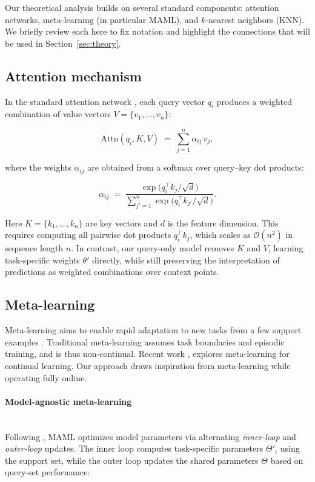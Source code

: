 \documentclass{article}
\begin{document}
Our theoretical analysis builds on several standard components: attention networks, 
meta-learning (in particular MAML), and $k$-nearest neighbors (KNN). 
We briefly review each here to fix notation and highlight the connections 
that will be used in Section~\ref{sec:theory}.

\subsection{Attention mechanism}

In the standard attention network \citep{vaswani2017attention}, each query vector $q_i$ produces a weighted combination of value vectors $V = \{v_1, \dots, v_n\}$:  

\begin{equation}
\text{Attn}(q_i, K, V) \;=\; \sum_{j=1}^n \alpha_{ij} \, v_j,
\label{eq:attention}
\end{equation}

where the weights $\alpha_{ij}$ are obtained from a softmax over query–key dot products:  

\begin{equation}
\alpha_{ij} \;=\; \frac{\exp\big( q_i^\top k_j / \sqrt{d} \big)}
{\sum\limits_{j'=1}^n \exp\big( q_i^\top k_{j'} / \sqrt{d} \big)} .
\label{eq:attention_weights}
\end{equation}

Here $K = \{k_1, \dots, k_n\}$ are key vectors and $d$ is the feature dimension.  
This requires computing all pairwise dot products $q_i^\top k_j$, which scales as $\mathcal{O}(n^2)$ in sequence length $n$.  
In contrast, our query-only model removes $K$ and $V$, learning task-specific weights $\theta'$ directly, while still preserving the interpretation of predictions as weighted combinations over context points.  



\subsection{Meta-learning}
Meta-learning aims to enable rapid adaptation to new tasks from a few support examples \citep{finn2017maml}. 
Traditional meta-learning assumes task boundaries and episodic training, and is thus non-continual. 
Recent work \citep{javed2019meta} , \citep{son2023meta} explores meta-learning for continual learning. 
Our approach draws inspiration from meta-learning while operating fully online.

\paragraph{Model-agnostic meta-learning}\hfill \\ 
Following \citet{finn2017maml}, MAML optimizes model parameters via alternating \emph{inner-loop} and \emph{outer-loop} updates. 
The inner loop computes task-specific parameters $\Theta'_i$ using the support set, while the outer loop updates the shared parameters $\Theta$ based on query-set performance:
\end{document}
